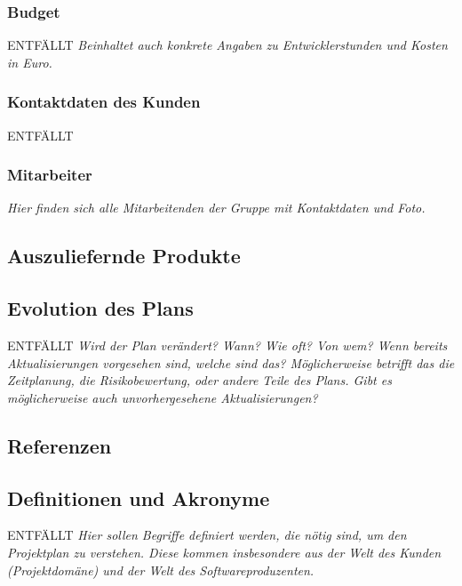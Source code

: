 \documentclass[fontsize=12pt,paper=a4,twoside]{scrartcl}
\begin{document}
\subsubsection{Budget}
ENTFÄLLT
{\em Beinhaltet auch konkrete Angaben zu Entwicklerstunden und Kosten in Euro.}


\subsubsection{Kontaktdaten des Kunden}
ENTFÄLLT
\subsubsection{Mitarbeiter}
{\em Hier finden sich alle Mitarbeitenden der Gruppe mit Kontaktdaten und Foto.}

\subsection{Auszuliefernde Produkte}


\subsection{Evolution des Plans}
ENTFÄLLT
{\em Wird der Plan verändert? Wann? Wie oft? Von wem? Wenn bereits Aktualisierungen vorgesehen sind, welche sind das? Möglicherweise betrifft das die Zeitplanung, die Risikobewertung, oder andere Teile des Plans. Gibt es möglicherweise auch unvorhergesehene Aktualisierungen?}

\subsection{Referenzen}
%
%
%
%

{\renewcommand\section[2]{}

}

\subsection{Definitionen und Akronyme}
ENTFÄLLT
{\em Hier sollen Begriffe definiert werden, die nötig sind, um den
  Projektplan zu verstehen. Diese kommen insbesondere aus der Welt des
  Kunden (Projektdomäne) und der Welt des Softwareproduzenten.}
\end{document}
